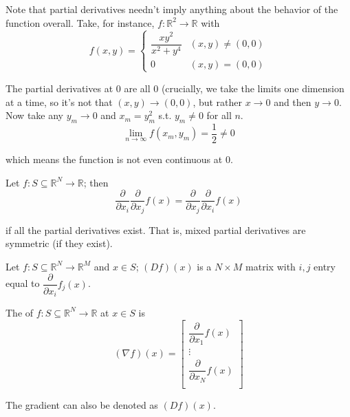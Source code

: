 \documentclass{article}
\begin{document}
Note that partial derivatives needn't imply anything about the behavior of the function overall. Take, for instance, $f: \mathbb{R}^2 \to \mathbb{R}$ with
\[
  f(x, y) =
  \begin{cases}
    \dfrac{xy^2}{x^2 + y^4} & (x, y) \ne (0, 0) \\
    0 & (x, y) = (0, 0)
  \end{cases}
\]

The partial derivatives at $0$ are all $0$ (crucially, we take the limits one dimension at a time, so it's not that $(x, y) \to (0, 0)$, but rather $x \to 0$ and then $y \to 0$. Now take any $y_m \to 0$ and $x_m = y_m^2$ s.t. $y_m \ne 0$ for all $n$.
\[
  \lim_{n \to \infty} f(x_m, y_m) = \dfrac{1}{2} \ne 0
\]

which means the function is not even continuous at $0$.

\begin{theorem}
  Let $f: S \subseteq \mathbb{R}^N \to \mathbb{R}$; then
  \[
    \dfrac{\partial}{\partial x_i} \dfrac{\partial}{\partial x_j} f(x)
    =
    \dfrac{\partial}{\partial x_j} \dfrac{\partial}{\partial x_i} f(x)
  \]

  if all the partial derivatives exist. That is, mixed partial derivatives are symmetric (if they exist).
\end{theorem}

\begin{definition}
  Let $f: S \subseteq \mathbb{R}^N \to \mathbb{R}^M$ and $x \in S$; $(Df)(x)$ is a $N \times M$ matrix with $i, j$ entry equal to $\dfrac{\partial}{\partial x_i} f_j(x)$.
\end{definition}

\begin{definition}
  The  of $f: S \subseteq \mathbb{R}^N \to \mathbb{R}$ at $x \in S$ is
  \[
    (\nabla f)(x) = \left[\begin{matrix}
      \dfrac{\partial}{\partial x_1} f(x) \\
      \vdots \\
      \dfrac{\partial}{\partial x_N} f(x) \\
    \end{matrix}\right]
  \]

  The gradient can also be denoted as $(Df)(x)$.
\end{definition}
\end{document}
